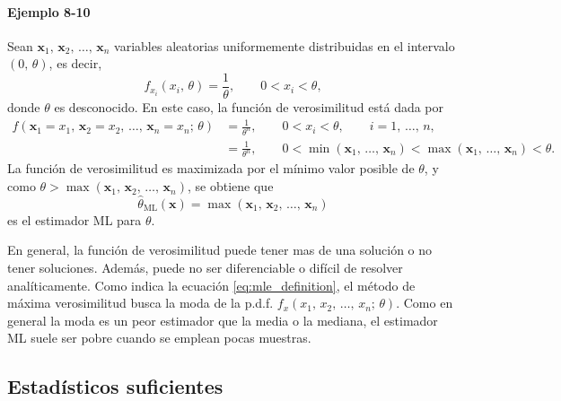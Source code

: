 \documentclass[a4paper]{report}
\newcommand{\x}{\mathbf{x}}
\begin{document}
\paragraph{Ejemplo 8-10} Sean \(\x_1,\,\x_2,\,\dots,\,\x_n\) variables aleatorias uniformemente distribuidas en el intervalo \((0,\,\theta)\), es decir,
\[
 f_{x_i}(x_i,\,\theta)=\frac{1}{\theta},\qquad 0<x_i<\theta,
\]
donde \(\theta\) es desconocido. En este caso, la función de verosimilitud está dada por 
\begin{align*}
 f(\x_1=x_1,\,\x_2=x_2,\,\dots,\,\x_n=x_n;\,\theta)&=\frac{1}{\theta^n},\qquad 0<x_i<\theta,\qquad i=1,\,\dots,\,n,\\
  &=\frac{1}{\theta^n},\qquad 0<\min(\x_1,\,\dots,\,\x_n)<\max(\x_1,\,\dots,\,\x_n)<\theta.
\end{align*}
La función de verosimilitud es maximizada por el mínimo valor posible de \(\theta\), y como \(\theta>\max(\x_1,\,\x_2,\,\dots,\,\x_n)\), se obtiene que
\[
 \hat{\theta}_\textrm{ML}(\x)=\max(\x_1,\,\x_2,\,\dots,\,\x_n)
\]
es el estimador ML para \(\theta\).

En general, la función de verosimilitud puede tener mas de una solución o no tener soluciones. Además, puede no ser diferenciable o difícil de resolver analíticamente. Como indica la ecuación \ref{eq:mle_definition}, el método de máxima verosimilitud busca la moda de la p.d.f. \(f_x(x_1,\,x_2,\,\dots,\,x_n;\,\theta)\). Como en general la moda es un peor estimador que la media o la mediana, el estimador ML suele ser pobre cuando se emplean pocas muestras.

\subsection{Estadísticos suficientes}
\end{document}
